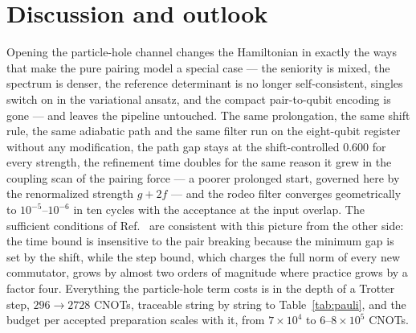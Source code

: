 \documentclass[
  aps,            %
  prc,            %
  reprint,        %
  superscriptaddress,
  floatfix,
  nofootinbib
]{revtex4-2}
\begin{document}
\section{Discussion and outlook}
\label{sec:discussion}
Opening the particle-hole channel changes the Hamiltonian in exactly the
ways that make the pure pairing model a special case --- the seniority is
mixed, the spectrum is denser, the reference determinant is no longer
self-consistent, singles switch on in the variational ansatz, and the
compact pair-to-qubit encoding is gone --- and leaves the pipeline
untouched.  The same prolongation, the same shift rule, the same adiabatic
path and the same filter run on the eight-qubit register without any
modification, the path gap stays at the shift-controlled $0.600$ for every
strength, the refinement time doubles for the same reason it grew in the
coupling scan of the pairing force --- a poorer prolonged start, governed
here by the renormalized strength $g+2f$ --- and the rodeo filter converges
geometrically to $10^{-5}$--$10^{-6}$ in ten cycles with the acceptance at
the input overlap.  The sufficient conditions of Ref.~\cite{Sadia2026} are
consistent with this picture from the other side: the time bound is
insensitive to the pair breaking because the minimum gap is set by the
shift, while the step bound, which charges the full norm of every new
commutator, grows by almost two orders of magnitude where practice grows by a
factor four.  Everything the particle-hole term costs is in the depth of a
Trotter step, $296\to2728$ CNOTs, traceable string by string to
Table~\ref{tab:pauli}, and the budget per accepted preparation scales with
it, from $7\times10^{4}$ to $6$--$8\times10^{5}$ CNOTs.
\end{document}
